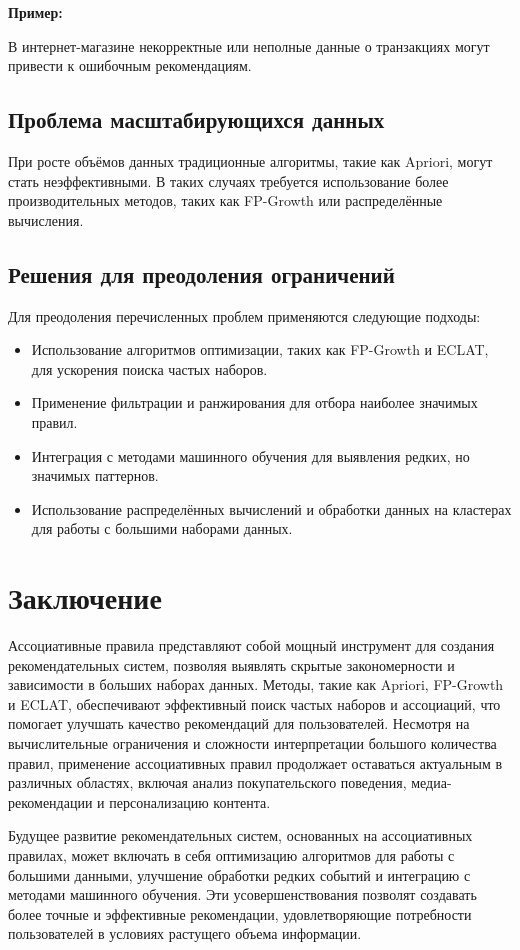 \textbf{Пример:}

В интернет-магазине некорректные или неполные данные о транзакциях могут привести к ошибочным рекомендациям.

\subsection{Проблема масштабирующихся данных}

При росте объёмов данных традиционные алгоритмы, такие как Apriori, могут стать неэффективными. В таких случаях требуется использование более производительных методов, таких как FP-Growth или распределённые вычисления.

\subsection{Решения для преодоления ограничений}

Для преодоления перечисленных проблем применяются следующие подходы:

\begin{itemize}
    \item Использование алгоритмов оптимизации, таких как FP-Growth и ECLAT, для ускорения поиска частых наборов.
    \item Применение фильтрации и ранжирования для отбора наиболее значимых правил.
    \item Интеграция с методами машинного обучения для выявления редких, но значимых паттернов.
    \item Использование распределённых вычислений и обработки данных на кластерах для работы с большими наборами данных.
\end{itemize}

\section{Заключение}
Ассоциативные правила представляют собой мощный инструмент для создания рекомендательных систем, позволяя выявлять скрытые закономерности и зависимости в больших наборах данных. Методы, такие как Apriori, FP-Growth и ECLAT, обеспечивают эффективный поиск частых наборов и ассоциаций, что помогает улучшать качество рекомендаций для пользователей. Несмотря на вычислительные ограничения и сложности интерпретации большого количества правил, применение ассоциативных правил продолжает оставаться актуальным в различных областях, включая анализ покупательского поведения, медиа-рекомендации и персонализацию контента.

Будущее развитие рекомендательных систем, основанных на ассоциативных правилах, может включать в себя оптимизацию алгоритмов для работы с большими данными, улучшение обработки редких событий и интеграцию с методами машинного обучения. Эти усовершенствования позволят создавать более точные и эффективные рекомендации, удовлетворяющие потребности пользователей в условиях растущего объема информации.
